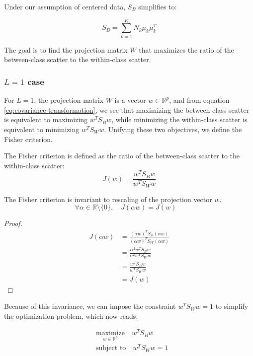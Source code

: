 Under our assumption of centered data, $S_B$ simplifies to:

\[
S_B = \sum_{k=1}^K N_k \mu_k \mu_k^T
\]

The goal is to find the projection matrix $W$ that maximizes the ratio of the between-class scatter to the within-class scatter.

\subsubsection{$L=1$ case}
For $L=1$, the projection matrix $W$ is a vector $w \in \mathbb{R}^p$, and from equation \ref{eq:covariance-transformation}, we see that maximizing the between-class scatter is equivalent to maximizing $w^T S_B w$, while minimizing the within-class scatter is equivalent to minimizing $w^T S_W w$. Unifying these two objectives, we define the Fisher criterion.

\begin{definition}
The Fisher criterion is defined as the ratio of the between-class scatter to the within-class scatter:
\[
J(w) = \frac{w^T S_B w}{w^T S_W w}
\]
\end{definition}


\begin{theorem}
The Fisher criterion is invariant to rescaling of the projection vector $w$.
\[
\forall \alpha \in \mathbb{R} \setminus \{0\}, \quad J(\alpha w) = J(w) \quad
\]
\end{theorem}

\begin{proof}
\begin{align*}
J(\alpha w) &= \frac{(\alpha w)^T S_B (\alpha w)}{(\alpha w)^T S_W (\alpha w)} \\
& = \frac{\alpha^2 w^T S_B w}{\alpha^2 w^T S_W w} \\
& = \frac{w^T S_B w}{w^T S_W w} \\
& = J(w)
\end{align*}
\end{proof}

Because of this invariance, we can impose the constraint $w^T S_W w = 1$ to simplify the optimization problem, which now reads:

\begin{align} \label{eq:single_dimension_optimization}
& \underset{w \in \mathbb{R}^p}{\mathrm{maximize}} \quad w^T S_B w \\
& \text{subject to} \quad w^T S_W w = 1 \nonumber
\end{align}

